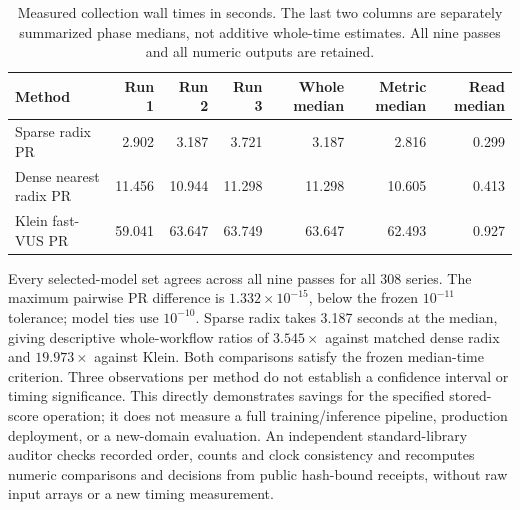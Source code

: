 \begin{table}[t]
\centering\small
\caption{Measured collection wall times in seconds. The last two columns
are separately summarized phase medians, not additive whole-time estimates.
All nine passes and all numeric outputs are retained.}
\label{tab:collection-workflow}
\begin{tabular}{lrrrrrr}
\toprule
Method & Run 1 & Run 2 & Run 3 & Whole median & Metric median & Read median\\
\midrule
Sparse radix PR & 2.902 & 3.187 & 3.721 & 3.187 & 2.816 & 0.299 \\
Dense nearest radix PR & 11.456 & 10.944 & 11.298 & 11.298 & 10.605 & 0.413 \\
Klein fast-VUS PR & 59.041 & 63.647 & 63.749 & 63.647 & 62.493 & 0.927 \\
\bottomrule
\end{tabular}
\end{table}
Every selected-model set agrees across all nine passes for all 308 series.
The maximum pairwise PR difference is $1.332\times10^{-15}$, below the frozen
$10^{-11}$ tolerance; model ties use $10^{-10}$. Sparse radix takes 3.187 seconds at the median,
giving descriptive whole-workflow ratios of $3.545\times$
against matched dense radix and $19.973\times$ against Klein.
Both comparisons satisfy the frozen median-time criterion. Three observations
per method do not establish a confidence interval or timing significance.
This directly demonstrates savings for the specified stored-score operation;
it does not measure a full training/inference pipeline, production deployment,
or a new-domain evaluation. An independent standard-library auditor
checks recorded order, counts and clock consistency and recomputes
numeric comparisons and decisions from public hash-bound receipts,
without raw input arrays or a new timing measurement.
